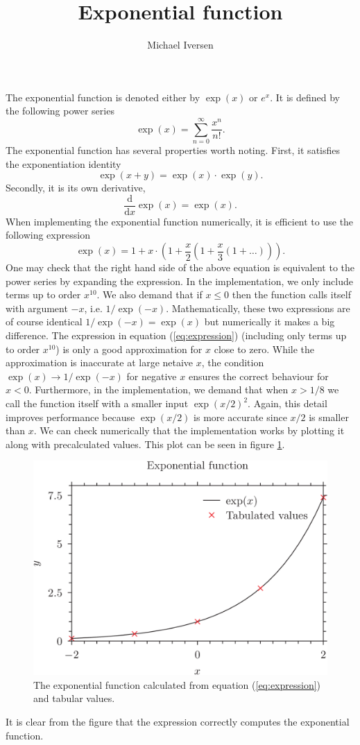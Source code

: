\documentclass{article}
\title{Exponential function}
\author{Michael Iversen}
\begin{document}
\maketitle
The exponential function is denoted either by $\exp(x)$ or $e^x$. It is defined by the following power series
\begin{equation}
\exp(x) = \sum_{n=0}^\infty \frac{x^n}{n!}.
\end{equation}
The exponential function has several properties worth noting. First, it satisfies the exponentiation identity
\begin{equation}
\exp(x + y) = \exp(x) \cdot \exp(y).
\end{equation}
Secondly, it is its own derivative,
\begin{equation}
\frac{\mathrm d}{\mathrm dx} \exp(x) = \exp(x).
\end{equation}
When implementing the exponential function numerically, it is efficient to use the following expression
\begin{equation}\label{eq:expression}
\exp(x) = 1 + x \cdot \left( 1 + \frac{x}{2} \left( 1 + \frac{x}{3} \left ( 1 + \ldots \right)\right)\right).
\end{equation}
One may check that the right hand side of the above equation is equivalent to the power series by expanding the expression.
In the implementation, we only include terms up to order $x^{10}$. 
We also demand that if $x \leq 0$ then the function calls itself with argument $-x$, i.e. $1 / \exp(-x)$.
Mathematically, these two expressions are of course identical $1 / \exp(-x) = \exp(x)$ but numerically it makes a big difference.
The expression in equation (\ref{eq:expression}) (including only terms up to order $x^{10}$) is only a good approximation for $x$ close to zero.
While the approximation is inaccurate at large netaive $x$, the condition $\exp(x) \to 1/\exp(-x)$ for negative $x$ ensures the correct behaviour for $x < 0$.
Furthermore, in the implementation, we demand that when $x > 1/8$ we call the function itself with a smaller input $\exp(x/2)^2$.
Again, this detail improves performance because $\exp(x/2)$ is more accurate since $x/2$ is smaller than $x$.
We can check numerically that the implementation works by plotting it along with precalculated values. 
This plot can be seen in figure \ref{fig:exp}.
\begin{figure}
\centering
\includegraphics{ex.png}
\caption{The exponential function calculated from equation (\ref{eq:expression}) and tabular values.}
\label{fig:exp}
\end{figure}
It is clear from the figure that the expression correctly computes the exponential function. 
\end{document}
